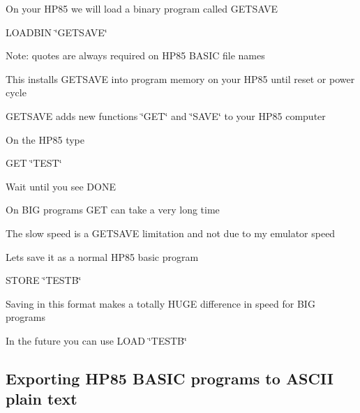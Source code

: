 On your H\+P85 we will load a binary program called G\+E\+T\+S\+A\+VE
\begin{DoxyItemize}
\item L\+O\+A\+D\+B\+IN \char`\"{}\+G\+E\+T\+S\+A\+V\+E\char`\"{}
\begin{DoxyItemize}
\item Note\+: quotes are always required on H\+P85 B\+A\+S\+IC file names
\item This installs G\+E\+T\+S\+A\+VE into program memory on your H\+P85 until reset or power cycle
\begin{DoxyItemize}
\item G\+E\+T\+S\+A\+VE adds new functions \char`\"{}\+G\+E\+T\char`\"{} and \char`\"{}\+S\+A\+V\+E\char`\"{} to your H\+P85 computer
\end{DoxyItemize}
\end{DoxyItemize}
\end{DoxyItemize}

On the H\+P85 type
\begin{DoxyItemize}
\item G\+ET \char`\"{}\+T\+E\+S\+T\char`\"{}
\begin{DoxyItemize}
\item Wait until you see D\+O\+NE
\begin{DoxyItemize}
\item On B\+IG programs G\+ET can take a very long time
\begin{DoxyItemize}
\item The slow speed is a G\+E\+T\+S\+A\+VE limitation and not due to my emulator speed
\end{DoxyItemize}
\end{DoxyItemize}
\end{DoxyItemize}
\item Lets save it as a normal H\+P85 basic program
\begin{DoxyItemize}
\item S\+T\+O\+RE \char`\"{}\+T\+E\+S\+T\+B\char`\"{}
\begin{DoxyItemize}
\item Saving in this format makes a totally H\+U\+GE difference in speed for B\+IG programs
\item In the future you can use L\+O\+AD \char`\"{}\+T\+E\+S\+T\+B\char`\"{}
\end{DoxyItemize}
\end{DoxyItemize}
\end{DoxyItemize}

\subsection*{Exporting H\+P85 B\+A\+S\+IC programs to A\+S\+C\+II plain text}


